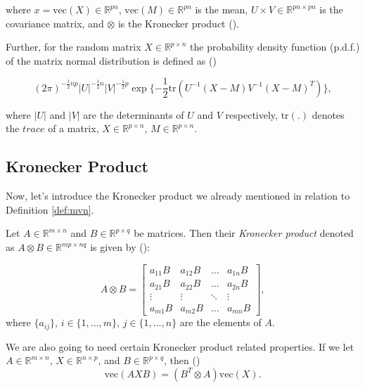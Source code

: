 \documentclass{mldsmsc}
\begin{document}
\noindent where $x = \text{vec}(X) \in \mathbb{R}^{pn}$, $\text{vec}(M) \in \mathbb{R}^{pn}$ is the mean, $U \times V \in \mathbb{R}^{pn \times pn}$ is the covariance matrix, and $\otimes$ is the Kronecker product (\cite{gupta}). \newline

\noindent Further, for the random matrix $X \in \mathbb{R}^{p \times n}$ the probability density function (p.d.f.) of the matrix normal distribution is defined as (\cite{gupta})

\begin{equation}
    (2\pi)^{-\frac{1}{2}np} |U|^{-\frac{1}{2}n} |V|^{-\frac{1}{2}p} \exp{\{-\frac{1}{2}\text{tr}(U^{-1}(X - M)V^{-1}(X - M)^{T})\}},
\end{equation}

\noindent where $|U|$ and $|V|$ are the determinants of $U$ and $V$ respectively, $\text{tr}(.)$ denotes the $\textit{trace}$ of a matrix, $X \in \mathbb{R}^{p \times n}$, $M \in \mathbb{R}^{p \times n}$.

\subsection{Kronecker Product}

Now, let's introduce the Kronecker product we already mentioned in relation to Definition \ref{def:mvn}.

\begin{definition}
Let $A \in \mathbb{R}^{m \times n}$ and $B \in \mathbb{R}^{p \times q}$ be matrices. Then their \textit{Kronecker product} denoted as $A \otimes B \in \mathbb{R}^{mp \times nq}$ is given by (\cite{alma993596394401591}):

\begin{equation}
    A \otimes B = \begin{bmatrix}
        a_{11}B & a_{12}B & \hdots & a_{1n}B \\
        a_{21}B & a_{22}B & \hdots & a_{2n}B \\
        \vdots & \vdots & \ddots & \vdots \\
        a_{m1}B & a_{m2}B & \hdots & a_{mn}B
    \end{bmatrix},
\end{equation}
where $\{a_{ij}\}$, $i \in \{1,...,m\}$, $j \in \{1, ..., n\}$ are the elements of $A$.
\end{definition}

\noindent We are also going to need certain Kronecker product related properties. If we let $A \in \mathbb{R}^{m \times n}$, $X \in \mathbb{R}^{n \times p}$, and $B \in \mathbb{R}^{p \times q}$, then (\cite{alma993596394401591})
\begin{equation} \label{eq:vecms}
    \text{vec}(AXB) = (B^T \otimes A) \text{vec}(X). 
\end{equation}
\end{document}
